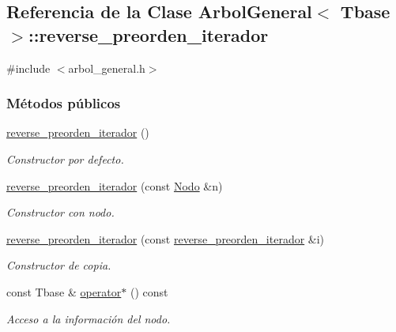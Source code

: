 \hypertarget{classArbolGeneral_1_1reverse__preorden__iterador}{}\subsection{Referencia de la Clase Arbol\+General$<$ Tbase $>$\+:\+:reverse\+\_\+preorden\+\_\+iterador}
\label{classArbolGeneral_1_1reverse__preorden__iterador}


{\ttfamily \#include $<$arbol\+\_\+general.\+h$>$}

\subsubsection*{Métodos públicos}
\begin{DoxyCompactItemize}
\item 
\hyperlink{classArbolGeneral_1_1reverse__preorden__iterador_a80a523317a7f93ef2359d16048d7bd7e}{reverse\+\_\+preorden\+\_\+iterador} ()
\begin{DoxyCompactList}\small\item\em Constructor por defecto. \end{DoxyCompactList}\item 
\hyperlink{classArbolGeneral_1_1reverse__preorden__iterador_aab2e21080ac46472a8a5a572c3b79ca9}{reverse\+\_\+preorden\+\_\+iterador} (const \hyperlink{classArbolGeneral_a12cc1b74a9095d89bc7334290d332f7a}{Nodo} \&n)
\begin{DoxyCompactList}\small\item\em Constructor con nodo. \end{DoxyCompactList}\item 
\hyperlink{classArbolGeneral_1_1reverse__preorden__iterador_a0fb07f7fb272f8257a912e1941d06f40}{reverse\+\_\+preorden\+\_\+iterador} (const \hyperlink{classArbolGeneral_1_1reverse__preorden__iterador}{reverse\+\_\+preorden\+\_\+iterador} \&i)
\begin{DoxyCompactList}\small\item\em Constructor de copia. \end{DoxyCompactList}\item 
const Tbase \& \hyperlink{classArbolGeneral_1_1reverse__preorden__iterador_a13eff9271fc2322fb191ba0323680a6d}{operator$\ast$} () const
\begin{DoxyCompactList}\small\item\em Acceso a la información del nodo. \end{DoxyCompactList}\item 

\end{DoxyCompactItemize}

